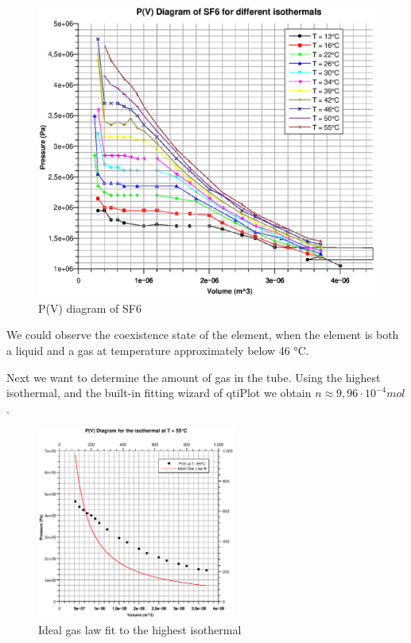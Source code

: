 \documentclass{scrartcl}
\begin{document}
\begin{figure}[h]
    \centering
    \includegraphics[width=12cm]{PVDiagramSF6.eps}
    \caption{P(V) diagram of SF6}
    \label{fig:3}
\end{figure}

We could observe the coexistence state of the element, when the element is both a liquid and a gas at temperature approximately below 46 °C.

\medskip

Next we want to determine the amount of gas in the tube. Using the highest isothermal, and the built-in fitting wizard of qtiPlot we obtain $\boxed{n \approx 9,96 \cdot 10^{-4} mol}$.

\begin{figure}[h]
    \centering
    \includegraphics[width=6.5cm]{IdealGasLawFitTemp55C.eps}
    \caption{Ideal gas law fit to the highest isothermal}
    \label{fig:5}
\end{figure}
\end{document}
